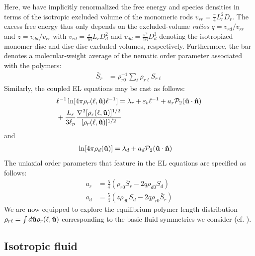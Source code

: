  Here, we have implicitly renormalized the free energy and species densities in terms of the isotropic excluded volume of the monomeric rods  $v_{rr} = \frac{\pi}{4} L_{r}^{2} D_{r}$. The excess free energy thus only depends on the excluded-volume {\em ratios}    $q= v_{rd}/v_{rr}$ and $z =v_{dd}/v_{rr}$  with $v_{rd} = \frac{\pi}{16} L_{r} D_{d}^{2} $ and $v_{dd} = \frac{\pi^{2}}{16} D_{d}^{3}$ denoting the isotropized  monomer-disc and disc-disc excluded volumes, respectively.
Furthermore, the bar denotes a molecular-weight average of the nematic order parameter associated with the polymers:
\begin{align}
\bar{S}_{r} &= \rho_{r0}^{-1}  \sum_{\ell} \rho_{r\ell} S_{r \ell} 
\label{srav}
\end{align}
Similarly, the coupled EL equations may be cast as follows: 
\begin{align}
& \ell^{-1} \ln [ 4 \pi \rho_{r} (\ell, {\bf \hat{u}} ) \ell^{-1} ]   = \lambda_{r}  + \varepsilon_{b} \ell^{-1} +  a_{r} {\mathcal P}_{2}({\bf \hat{u}} \cdot {\bf \hat{n}}) \nonumber \\ 
&  +\frac{L_{r}}{3\ell_{p}} \frac{\nabla^{2} [ \rho_{r} (\ell , {\bf \hat{u}})]^{1/2}}{ [ \rho_{r} (\ell , {\bf \hat{u}})]^{1/2} }
\label{lnrhor}
\end{align}
and
\begin{align}
\ln [ 4 \pi  \rho_{d} ({\bf \hat{u}} )] & = \lambda_{d}  + a_{d} {\mathcal P}_{2}({\bf \hat{u}} \cdot {\bf \hat{n}})  
\label{lnd}
\end{align}
The uniaxial order parameters that feature in the EL equations are specified as follows:
\begin{align}
a_{r} &=    \frac{5 }{4}  ( \rho_{r0}  \bar{S}_{r} -   2  q\rho_{d0}  S_{d} )  \nonumber \\
a_{d} &=   \frac{5}{4} (  z \rho_{d0}   S_{d}  -  2q  \rho_{r0} \bar{S}_{r} )  
\label{alphabeta}
\end{align}
We  are now equipped to explore the equilibrium polymer length distribution  $\rho_{r \ell} =  \int d {\bf \hat{u}} \rho_{r} (\ell, {\bf \hat{u}})$ corresponding to the basic fluid symmetries we consider (cf. ).

\subsection{Isotropic fluid}

